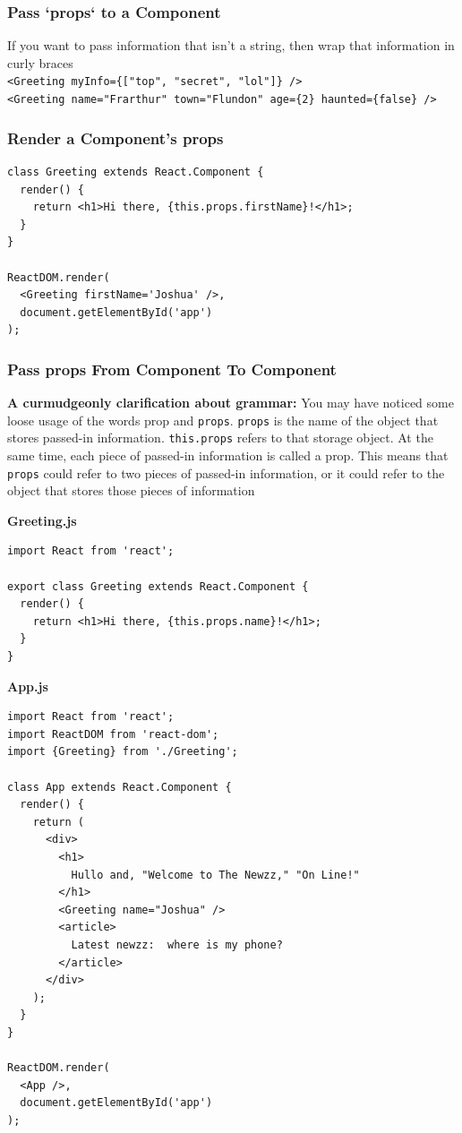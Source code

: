 \documentclass[a4paper, 12pt]{article}
\begin{document}
\subsubsection{Pass `props` to a Component}
If you want to pass information that isn't a string, then wrap that information in curly braces\\
\verb|<Greeting myInfo={["top", "secret", "lol"]} />|\\
\verb|<Greeting name="Frarthur" town="Flundon" age={2} haunted={false} />|

\subsubsection{Render a Component's props}
\begin{verbatim}
class Greeting extends React.Component {
  render() {
    return <h1>Hi there, {this.props.firstName}!</h1>;
  }
}

ReactDOM.render(
  <Greeting firstName='Joshua' />, 
  document.getElementById('app')
);
\end{verbatim}

\subsubsection{Pass props From Component To Component}
\textbf{A curmudgeonly clarification about grammar:} You may have noticed some loose usage of the words prop and \verb|props|. \verb|props| is the name of the object that stores passed-in information. \verb|this.props| refers to that storage object. At the same time, each piece of passed-in information is called a prop. This means that \verb|props| could refer to two pieces of passed-in information, or it could refer to the object that stores those pieces of information

\textbf{Greeting.js}
\begin{verbatim}
import React from 'react';

export class Greeting extends React.Component {
  render() {
    return <h1>Hi there, {this.props.name}!</h1>;
  }
}
\end{verbatim}

\textbf{App.js}
\begin{verbatim}
import React from 'react';
import ReactDOM from 'react-dom';
import {Greeting} from './Greeting';

class App extends React.Component {
  render() {
    return (
      <div>
        <h1>
          Hullo and, "Welcome to The Newzz," "On Line!"
        </h1>
        <Greeting name="Joshua" />
        <article>
          Latest newzz:  where is my phone?
        </article>
      </div>
    );
  }
}

ReactDOM.render(
  <App />, 
  document.getElementById('app')
);
\end{verbatim}
\end{document}
